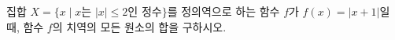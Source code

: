 집합 $X=\{x \mid x$는 $|x|\le 2$인 정수$\}$를 정의역으로 하는 함수 $f$가 $f(x)=|x+1|$일 때, 함수 $f$의 치역의 모든 원소의 합을 구하시오.
